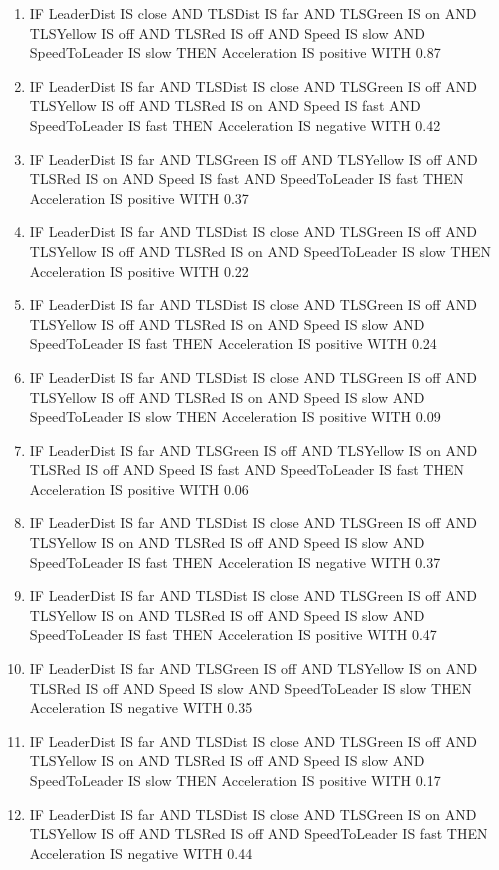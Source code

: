 \begin{enumerate}
	\item IF LeaderDist IS close AND TLSDist IS far AND TLSGreen IS on AND TLSYellow IS off AND TLSRed IS off AND Speed IS slow AND SpeedToLeader IS slow THEN Acceleration IS positive WITH 0.87
	\item IF LeaderDist IS far AND TLSDist IS close AND TLSGreen IS off AND TLSYellow IS off AND TLSRed IS on AND Speed IS fast AND SpeedToLeader IS fast THEN Acceleration IS negative WITH 0.42
	\item IF LeaderDist IS far AND TLSGreen IS off AND TLSYellow IS off AND TLSRed IS on AND Speed IS fast AND SpeedToLeader IS fast THEN Acceleration IS positive WITH 0.37
	\item IF LeaderDist IS far AND TLSDist IS close AND TLSGreen IS off AND TLSYellow IS off AND TLSRed IS on AND SpeedToLeader IS slow THEN Acceleration IS positive WITH 0.22
	\item IF LeaderDist IS far AND TLSDist IS close AND TLSGreen IS off AND TLSYellow IS off AND TLSRed IS on AND Speed IS slow AND SpeedToLeader IS fast THEN Acceleration IS positive WITH 0.24
	\item IF LeaderDist IS far AND TLSDist IS close AND TLSGreen IS off AND TLSYellow IS off AND TLSRed IS on AND Speed IS slow AND SpeedToLeader IS slow THEN Acceleration IS positive WITH 0.09
	\item IF LeaderDist IS far AND TLSGreen IS off AND TLSYellow IS on AND TLSRed IS off AND Speed IS fast AND SpeedToLeader IS fast THEN Acceleration IS positive WITH 0.06
	\item IF LeaderDist IS far AND TLSDist IS close AND TLSGreen IS off AND TLSYellow IS on AND TLSRed IS off AND Speed IS slow AND SpeedToLeader IS fast THEN Acceleration IS negative WITH 0.37
	\item IF LeaderDist IS far AND TLSDist IS close AND TLSGreen IS off AND TLSYellow IS on AND TLSRed IS off AND Speed IS slow AND SpeedToLeader IS fast THEN Acceleration IS positive WITH 0.47
	\item IF LeaderDist IS far AND TLSGreen IS off AND TLSYellow IS on AND TLSRed IS off AND Speed IS slow AND SpeedToLeader IS slow THEN Acceleration IS negative WITH 0.35
	\item IF LeaderDist IS far AND TLSDist IS close AND TLSGreen IS off AND TLSYellow IS on AND TLSRed IS off AND Speed IS slow AND SpeedToLeader IS slow THEN Acceleration IS positive WITH 0.17
	\item IF LeaderDist IS far AND TLSDist IS close AND TLSGreen IS on AND TLSYellow IS off AND TLSRed IS off AND SpeedToLeader IS fast THEN Acceleration IS negative WITH 0.44

\end{enumerate}
